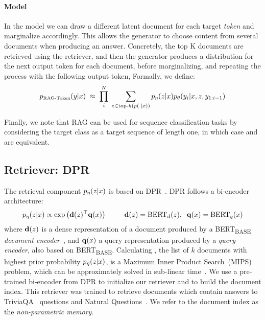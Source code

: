\paragraph{\ragtoken{} Model}
In the \ragtoken{} model we can draw a different latent document for each target \emph{token} and marginalize accordingly. This allows the generator to choose content from several documents when producing an answer. Concretely, the top K documents are retrieved using the retriever, and then the generator produces a distribution for the next output token for each document, before marginalizing, and repeating the process with the following output token,  Formally, we define:
\[
\pertoken(\answer|\query) \; \approx \; \prod_{i}^N \; \sum_{\doc \in \text{top-}k(p(\cdot|\query))} p_\retparam(\doc|\query) p_\genparam(y_i|\query, \doc, y_\history{i})
\]

Finally, we note that RAG can be used for sequence classification tasks by considering the target class as a target sequence of length one, in which case \raganswer{} and \ragtoken{} are equivalent.

\subsection{Retriever: DPR}
The retrieval component $p_{\eta}(z|x)$ is based on DPR~\cite{Karpukhin20dense}. DPR follows a bi-encoder architecture:
\[
p_{\eta}(z|x) \propto \exp \left(\mathbf{d}(z)^{\top} \mathbf{q}(x)\right) \; \; \; \; \; \; \; \; \; \mathbf{d}(z) = \text{BERT}_{d}(z), \; \; \mathbf{q}(x)=\text{BERT}_{q}(x)
\] 
where $\mathbf{d}(z)$ is a dense representation of a document produced by a BERT\textsubscript{BASE} \emph{document encoder}~\cite{devlin_bert:_2019}, and $\mathbf{q}(x)$ a query representation produced by a \emph{query encoder}, also based on  BERT\textsubscript{BASE}. 
Calculating \topk{}, the list of $k$ documents \doc{} with highest prior probability $p_\eta(z|x)$, is a Maximum Inner Product Search~(MIPS) problem, which can be approximately solved in sub-linear time~\cite{JDH17}. 
We use a pre-trained bi-encoder from DPR to initialize our retriever and to build the document index. This retriever was trained to retrieve documents which contain answers to  TriviaQA~\cite{joshi_triviaqa:_2017} questions and Natural Questions~\cite{kwiatkowski_natural_2019}. We refer to the document index as the \emph{non-parametric memory}.

